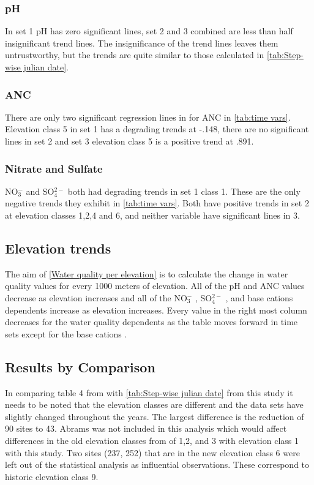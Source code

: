 \subsubsection{pH}

In set 1 pH has zero significant lines, set 2 and 3 combined are less than half insignificant trend lines. The insignificance of the trend lines leaves them untrustworthy, but the trends are quite similar to those calculated in \autoref{tab:Step-wise julian date}.

\subsubsection{ANC}

There are only two significant regression lines in for ANC in \autoref{tab:time vars}. Elevation class 5 in set 1 has a degrading trends at -.148, there are no significant lines in set 2 and set 3 elevation class 5 is a positive trend at .891.

\subsubsection{Nitrate and Sulfate}

NO$_3^-$ and SO$_4^{2-}$ both had degrading trends in set 1 class 1. These are the only negative trends they exhibit in \autoref{tab:time vars}.  Both have positive trends in set 2 at elevation classes 1,2,4 and 6, and neither variable have significant lines in 3.

\subsection{Elevation trends}

The aim of \autoref{Water quality per elevation} is to calculate the change in water quality values for every 1000 meters of elevation.  All of the pH and ANC values decrease as elevation increases and all of the  NO$_3^-$ , SO$_4^{2-}$ , and base cations dependents increase as elevation increases.  Every value in the right most column decreases for the water quality dependents as the table moves forward in time sets except for the base cations .

\subsection{Results by Comparison}

In comparing table 4 from \citet{robinson2008ph} with \autoref{tab:Step-wise julian date} from this study it needs to be noted that the elevation classes are different and the data sets have slightly changed throughout the years. The largest difference is the reduction of 90 sites to 43. Abrams was not included in this analysis which would affect differences in the old elevation classes from \citet{robinson2008ph} of 1,2, and 3 with elevation class 1 with this study. Two sites (237, 252) that are in the new elevation class 6 were left out of the statistical analysis as influential observations. These correspond to historic elevation class 9.

